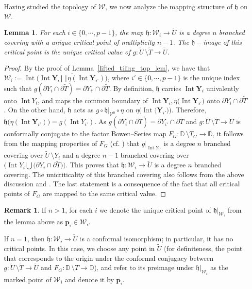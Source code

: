 \documentclass[11pt,a4paper, oneside]{amsart}
\newtheorem{lemma}[thm]{Lemma}
\theoremstyle{definition}
\newtheorem{rem}[thm]{Remark}
\theoremstyle{remark}
\DeclareMathOperator{\Int}{Int}
\numberwithin{equation}{section}
\def\D{{\mathbb{D}}}
\def\cV{\mathcal {V}}
\def\cW{\mathcal {W}}
\newcommand{\sm}{\setminus}
\renewcommand{\tilde}{\widetilde}
\begin{document}
Having studied the topology of $\pmb{\cW}$, we now analyze the mapping structure of $\mathfrak{h}$ on $\pmb{\cW}$.

\begin{lemma}\label{h_branched_cover_lem}
For each $i\in\{0,\cdots,p-1\}$, the map $\mathfrak{h}:\pmb{\cW}_i\to\tilde U$ is a degree $n$ branched covering with a unique critical point of multiplicity $n-1$. The $\mathfrak{h}-$image of this critical point is the unique critical value of $g:\tilde U\,\sm\tilde T\to\tilde U$.  
\end{lemma}


\begin{proof}
By the proof of Lemma~\ref{lifted_tiling_top_lem}, we have that $\pmb{\cW}_i:=\Int{\Bigg(\overline{\Int{\pmb{Y}_i}\bigsqcup\eta(\Int{\pmb{Y}_{i'}})}\Bigg)}$, where $i'\in\{0,\cdots,p-1\}$ is the unique index such that $g(\partial Y_i\cap\partial\tilde T)=\partial Y_{i'}\cap\partial\tilde T$. By definition, $\mathfrak{h}$ carries $\Int{\pmb{Y}_i}$ univalently onto $\Int{Y_i}$, and maps the common boundary of $\Int{\pmb{Y}_i},\eta\big(\Int{\pmb{Y}_{i'}}\big)$ onto $\partial Y_i\cap\partial\tilde T$. On the other hand, $\mathfrak{h}$ acts as $g\circ\mathfrak{h}\vert_{\cV^0}\circ\eta$ on $\eta\big(\Int{(\pmb{Y}_{i'}})\big)$. Therefore, $\mathfrak{h}\big(\eta(\Int{\pmb{Y}_{i'}})\big)=g(\Int{Y_{i'}})$. As $g(\partial Y_i\cap\partial\tilde T)=\partial Y_{i'}\cap\partial\tilde T$ and $g \colon \tilde U\,\sm\tilde T \to \tilde U$ is conformally conjugate to the factor Bowen--Series map $F_G \colon\D\,\sm T_G\to\D$, it follows from the mapping properties of $F_G$ (cf. \cite[Proposition~2.7]{MM}) that $g\vert_{\Int{Y_{i'}}}$ is a degree $n$ branched covering over $\tilde U\,\sm Y_i$ and a degree $n-1$ branched covering over $\Big(\Int{Y_i}\bigcup\big(\partial Y_{i}\cap\partial\tilde T\big)\Big)$.  This proves that $\mathfrak{h}:\pmb{\cW}_i\to\tilde U$ is a degree $n$ branched covering. The unicriticality of this branched covering also follows from the above discussion and \cite[Proposition~2.7]{MM}. The last statement is a consequence of the fact that all critical points of $F_G$ are mapped to the same critical value.
\end{proof}

\begin{rem}\label{marking_rem}
If $n > 1$, for each $i$ we denote the unique critical point of $\mathfrak{h}\vert_{\pmb{\cW}_i}$ from the lemma above as $\pmb{p}_i \in \pmb{\mathcal W}_i$.

If $n=1$, then $\mathfrak{h}:\pmb{\cW}_i\to\tilde U$ is a conformal isomorphism; in 
particular, it has no critical points. In this case, we choose any point in $\tilde U$ (for definiteness, the point that corresponds to the origin under the conformal conjugacy between $g:\tilde U\,\sm\tilde T\to\tilde U$ and $F_G:\D\,\sm T\to \D$), and refer to its preimage under $\mathfrak{h}\vert_{\pmb{\cW}_i}$ as the marked point of $\pmb{\cW}_i$ and denote it by $\pmb{p}_i$.
\end{rem}
\end{document}
